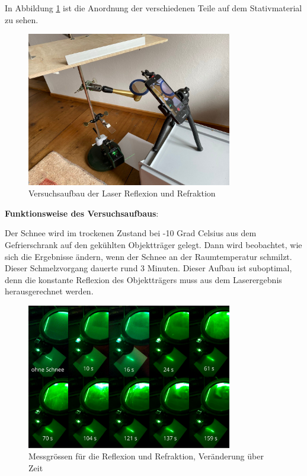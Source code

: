 In Abbildung \ref{fig:LaserAufbau} ist die Anordnung der verschiedenen Teile auf dem Stativmaterial zu sehen.


\begin{figure}
    \centering
    \includegraphics[width=0.8\textwidth]{Bilder/signal-2024-03-10-112013_006.jpeg}
    \caption{Versuchsaufbau der Laser Reflexion und Refraktion}
    \label{fig:LaserAufbau}
\end{figure}


\textbf{Funktionsweise des Versuchsaufbaus}:

Der Schnee wird im trockenen Zustand bei -10 Grad Celsius aus dem Gefrierschrank auf den gekühlten Objektträger gelegt. Dann wird beobachtet, wie sich die Ergebnisse ändern, wenn der Schnee an der Raumtemperatur schmilzt. Dieser Schmelzvorgang dauerte rund 3 Minuten. Dieser Aufbau ist suboptimal, denn die konstante Reflexion des Objektträgers muss aus dem Laserergebnis herausgerechnet werden.


\begin{figure}[H]
    \centering
    \includegraphics[width=0.8\textwidth]{Bilder/Screenshotfrom2024-04-0413-27-28.png}
    \caption{Messgrössen für die Reflexion und Refraktion, Veränderung über Zeit}
    \label{fig:LaserRef}
\end{figure}




